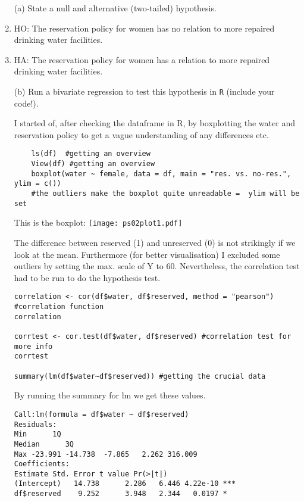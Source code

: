 \documentclass[12pt,letterpaper]{article}
\begin{document}
\newpage
\begin{enumerate}
	\item [(a)] State a null and alternative (two-tailed) hypothesis. 
\\
\item HO: The reservation policy for women has no relation to more repaired drinking water facilities.
\item HA: The reservation policy for women has a relation to more repaired drinking water facilities.
	
	\vspace{.2cm}
	\item [(b)] Run a bivariate regression to test this hypothesis in \texttt{R} (include your code!).
	
I started of, after checking the dataframe in R, by boxplotting the water and reservation policy to get a vague understanding of any differences etc.
\begin{verbatim}
	ls(df)  #getting an overview  
	View(df) #getting an overview	
	boxplot(water ~ female, data = df, main = "res. vs. no-res.", ylim = c())
	#the outliers make the boxplot quite unreadable =  ylim will be set
\end{verbatim}

This is the boxplot:
\texttt{[image: ps02plot1.pdf]}

The difference between reserved (1) and unreserved (0) is not strikingly if we look at the mean. Furthermore (for better visualisation) I excluded some outliers by setting the max. scale of Y to 60. Nevertheless, the correlation test had to be run to do the hypothesis test.


\newpage
\begin{verbatim}
correlation <- cor(df$water, df$reserved, method = "pearson") 
#correlation function
correlation

corrtest <- cor.test(df$water, df$reserved) #correlation test for more info
corrtest

summary(lm(df$water~df$reserved)) #getting the crucial data
	\end{verbatim}

By running the summary for lm we get these values.

\begin{verbatim}
Call:lm(formula = df$water ~ df$reserved)
Residuals:    
Min      1Q  
Median      3Q     
Max -23.991 -14.738  -7.865   2.262 316.009 
Coefficients:            
Estimate Std. Error t value Pr(>|t|)    
(Intercept)   14.738      2.286   6.446 4.22e-10 ***
df$reserved    9.252      3.948   2.344   0.0197 *  


\end{verbatim}
\end{enumerate}
\end{document}
